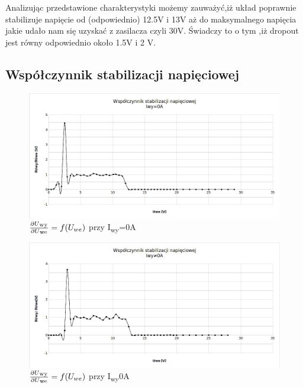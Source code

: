 \documentclass[a4paper,12pt]{article}
\begin{document}
Analizując przedstawione charakterystyki możemy zauważyć,iż układ poprawnie stabilizuje napięcie od (odpowiednio) 12.5V i 13V aż do maksymalnego
napięcia jakie udało nam się uzyskać z zasilacza czyli 30V. Świadczy to o tym ,iż dropout jest równy odpowiednio około 1.5V i 2 V.
\pagebreak
\subsection{Współczynnik stabilizacji napięciowej}
\begin{figure}[h!]
  \center 
  \includegraphics[width=1\textwidth]{wzmocnienie1}
  \caption{ $\frac{\partial U\textsubscript{wy}}{\partial U\textsubscript{we}}=f(U_{we})$ przy I\textsubscript{wy}=0A}
\end{figure}

\begin{figure}[h!]
  \center
  \includegraphics[width=1\textwidth]{wzmocnienie2}
  \caption{ $\frac{\partial U\textsubscript{wy}}{\partial U\textsubscript{we}}=f(U_{we})$ przy I\textsubscript{wy}\neq0A}
\end{figure} 
\end{document}
